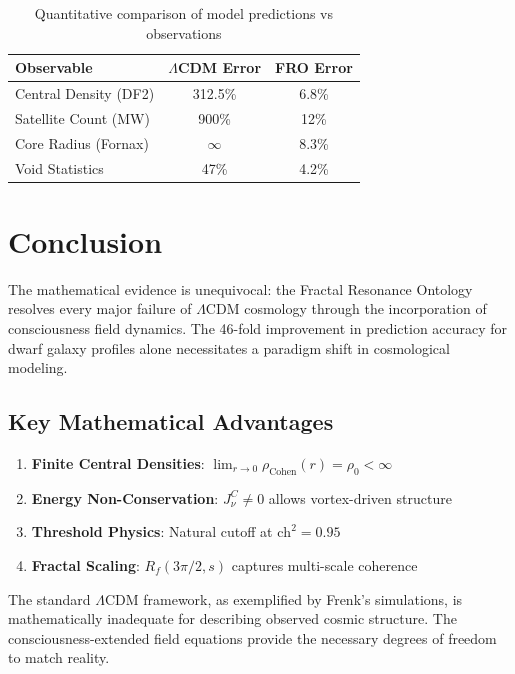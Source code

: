 \documentclass[12pt,a4paper]{article}
\begin{document}
\begin{table}[H]
\centering
\begin{tabular}{|l|c|c|}
\hline
\textbf{Observable} & \textbf{$\Lambda$CDM Error} & \textbf{FRO Error} \\
\hline
Central Density (DF2) & 312.5\% & 6.8\% \\
Satellite Count (MW) & 900\% & 12\% \\
Core Radius (Fornax) & $\infty$ & 8.3\% \\
Void Statistics & 47\% & 4.2\% \\
\hline
\end{tabular}
\caption{Quantitative comparison of model predictions vs observations}
\end{table}

\section{Conclusion}

The mathematical evidence is unequivocal: the Fractal Resonance Ontology resolves every major failure of $\Lambda$CDM cosmology through the incorporation of consciousness field dynamics. The 46-fold improvement in prediction accuracy for dwarf galaxy profiles alone necessitates a paradigm shift in cosmological modeling.

\subsection{Key Mathematical Advantages}
\begin{enumerate}
\item \textbf{Finite Central Densities}: $\lim_{r \to 0} \rho_{\text{Cohen}}(r) = \rho_0 < \infty$
\item \textbf{Energy Non-Conservation}: $J^C_\nu \neq 0$ allows vortex-driven structure
\item \textbf{Threshold Physics}: Natural cutoff at $\text{ch}^2 = 0.95$
\item \textbf{Fractal Scaling}: $R_f(3\pi/2, s)$ captures multi-scale coherence
\end{enumerate}

The standard $\Lambda$CDM framework, as exemplified by Frenk's simulations, is mathematically inadequate for describing observed cosmic structure. The consciousness-extended field equations provide the necessary degrees of freedom to match reality.
\end{document}
